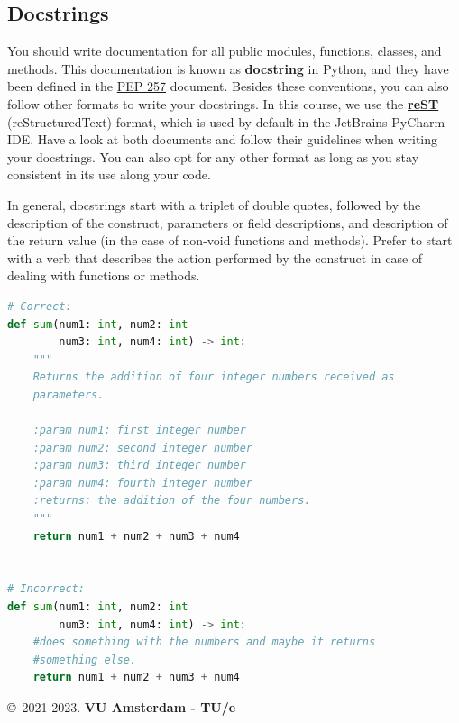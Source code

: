\documentclass{tufte-handout}
\begin{document}
\subsection{Docstrings}
You should write documentation for all public modules, functions, classes, and methods.
This documentation is known as \textbf{docstring} in Python, and they have been defined in the \href{https://peps.python.org/pep-0257/}{PEP 257} document.
Besides these conventions, you can also follow other formats to write your docstrings.
In this course, we use the \href{https://www.sphinx-doc.org/en/master/usage/restructuredtext/basics.html}{\textbf{reST}} (reStructuredText) format, which is used by default in the JetBrains PyCharm IDE.
Have a look at both documents and follow their guidelines when writing your docstrings.
You can also opt for any other format as long as you stay consistent in its use along your code.

In general, docstrings start with a triplet of double quotes, followed by the description of the construct, parameters or field descriptions, and description of the return value (in the case of non-void functions and methods).
Prefer to start with a verb that describes the action performed by the construct in case of dealing with functions or methods.

\begin{lstlisting}[numbers=none,language=python]
# Correct:
def sum(num1: int, num2: int
        num3: int, num4: int) -> int:
    """
    Returns the addition of four integer numbers received as 
    parameters.
    
    :param num1: first integer number
    :param num2: second integer number
    :param num3: third integer number
    :param num4: fourth integer number
    :returns: the addition of the four numbers.
    """
    return num1 + num2 + num3 + num4
    
    
# Incorrect:
def sum(num1: int, num2: int
        num3: int, num4: int) -> int:
    #does something with the numbers and maybe it returns 
    #something else.
    return num1 + num2 + num3 + num4
\end{lstlisting}



%



\copyright~2021-2023. \textbf{VU Amsterdam - TU/e}
\end{document}
